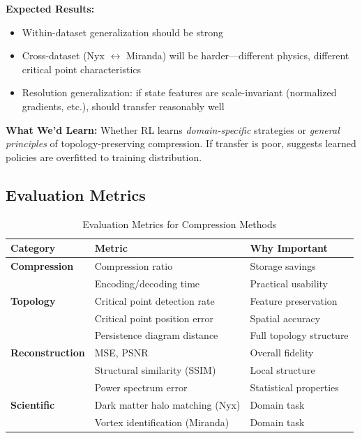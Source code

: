 \documentclass[11pt]{article}
\begin{document}
\textbf{Expected Results:}
\begin{itemize}
    \item Within-dataset generalization should be strong
    \item Cross-dataset (Nyx $\leftrightarrow$ Miranda) will be harder—different physics, different critical point characteristics
    \item Resolution generalization: if state features are scale-invariant (normalized gradients, etc.), should transfer reasonably well
\end{itemize}

\textbf{What We'd Learn:} Whether RL learns \textit{domain-specific} strategies or \textit{general principles} of topology-preserving compression. If transfer is poor, suggests learned policies are overfitted to training distribution.

\subsection{Evaluation Metrics}

\begin{table}[h]
\centering
\caption{Evaluation Metrics for Compression Methods}
\begin{tabular}{@{}lll@{}}
\toprule
\textbf{Category} & \textbf{Metric} & \textbf{Why Important} \\ \midrule
\textbf{Compression} & Compression ratio & Storage savings \\
& Encoding/decoding time & Practical usability \\ \midrule
\textbf{Topology} & Critical point detection rate & Feature preservation \\
& Critical point position error & Spatial accuracy \\
& Persistence diagram distance & Full topology structure \\ \midrule
\textbf{Reconstruction} & MSE, PSNR & Overall fidelity \\
& Structural similarity (SSIM) & Local structure \\
& Power spectrum error & Statistical properties \\ \midrule
\textbf{Scientific} & Dark matter halo matching (Nyx) & Domain task \\
& Vortex identification (Miranda) & Domain task \\ \bottomrule
\end{tabular}
\end{table}
\end{document}
